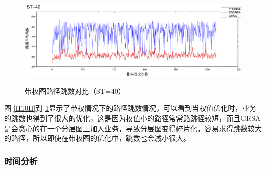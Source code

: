 \begin{figure}
\setlength{\belowcaptionskip}{-0.5cm}
\begin{center}
{\includegraphics[width=1 \textwidth]{figures/H40H.pdf}}
\end{center}
\caption{{\footnotesize{带权图路径跳数对比（ST=40）}}}
\label{H40H}
\end{figure}

图 \ref{H10H}到 \ref{H40H}显示了带权情况下的路径跳数情况，可以看到当权值优化时，业务的跳数也得到了很大的优化，这是因为权值小的路径常常路跳径较短，而且GRSA是会贪心的在一个分层图上加入业务，导致分层图变得碎片化，容易求得跳数较大的路径，所以即使在带权图的优化中，跳数也会减小很大。
\subsubsection{时间分析}

